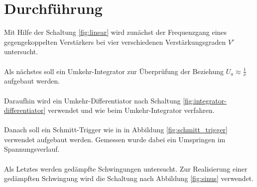 \documentclass[
  bibliography=totoc,     %
  captions=tableheading,  %
  titlepage=firstiscover, %
]{scrartcl}
\begin{document}
\clearpage


\section{Durchführung}
\label{sec:durchführung}


Mit Hilfe der Schaltung
\ref{fig:linear} wird zunächst der Frequenzgang eines gegengekoppelten Verstärkers bei vier
verschiedenen Verstärkungsgraden $V'$ untersucht. \\
\\
\noindent
Als nächstes soll ein Umkehr-Integrator zur Überprüfung der Beziehung
$U_a \approx \frac{1}{\nu}$ aufgebaut werden. \\
\\
\noindent
Daraufhin wird ein Umkehr-Differentiator nach Schaltung \ref{fig:integrator-differentiator} verwendet
und wie beim Umkehr-Integrator verfahren. \\
\\
\noindent
Danach soll ein Schmitt-Trigger wie in in Abbildung \ref{fig:schmitt_trigger} verwendet aufgebaut werden.
Gemessen wurde dabei ein Umspringen im Spannungsverlauf. \\
\\
\noindent
Als Letztes werden gedämpfte Schwingungen untersucht. Zur Realisierung einer gedämpften Schwingung wird die Schaltung nach Abbildung \ref{fig:sinus} verwendet.
\end{document}
